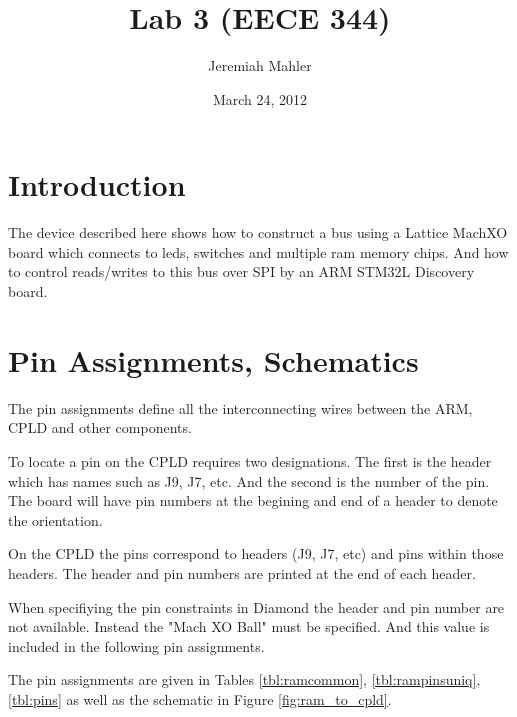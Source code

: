 \documentclass{article}
\begin{document}

\title{Lab 3 (EECE 344)}
\date{March 24, 2012}
\author{Jeremiah Mahler}

\maketitle

\tableofcontents

\pagebreak

\section{Introduction}

The device described here shows how to construct a bus
using a Lattice MachXO\cite{EB66} board which connects
to leds, switches and multiple ram memory chips.
And how to control reads/writes to this bus
over SPI by an ARM STM32L Discovery\cite{UM1079} board.


\section{Pin Assignments, Schematics}
\label{sec:pa}

The pin assignments define all the interconnecting wires
between the ARM, CPLD and other components.

To locate a pin on the CPLD requires two designations\citep[Pg. 11-14]{EB66}.
The first is the header which has names such as J9, J7, etc.
And the second is the number of the pin.
The board will have pin numbers at the begining and end of a header
to denote the orientation.

On the CPLD the pins correspond to headers (J9, J7, etc)
and pins within those headers\citep[Pg. 11-14]{EB66}.
The header and pin numbers are printed at the end of each header.

When specifiying the pin constraints in Diamond\cite{Diamond}
the header and pin number are not available.
Instead the "Mach XO Ball" must be specified.
And this value is included in the following pin assignments.

The pin assignments are given in Tables
\ref{tbl:ramcommon}, \ref{tbl:rampinsuniq}, \ref{tbl:pins}
as well as the schematic in Figure \ref{fig:ram_to_cpld}.
\end{document}
